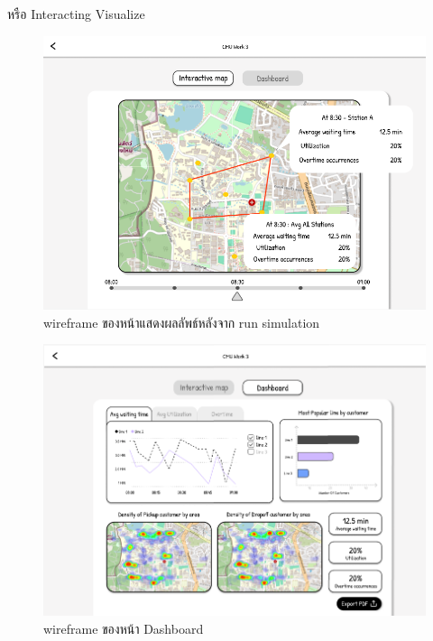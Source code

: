 \begin{mypara}
\begin{itemize}
    หรือ Interacting Visualize
    \begin{figure}[H]
    \centering
    \includegraphics[scale=0.4]{output_show.png}
    \caption{wireframe ของหน้าแสดงผลลัพธ์หลังจาก run simulation}
    \label{fig:WireframeOutputLogin}
    \end{figure}
    \begin{figure}[H]
    \centering
    \includegraphics[scale=0.4]{dashboard.png}
    \caption{wireframe ของหน้า Dashboard }
    \label{fig:WireframeDashboardLogin}
    \end{figure}
    \end{itemize}

\end{mypara}